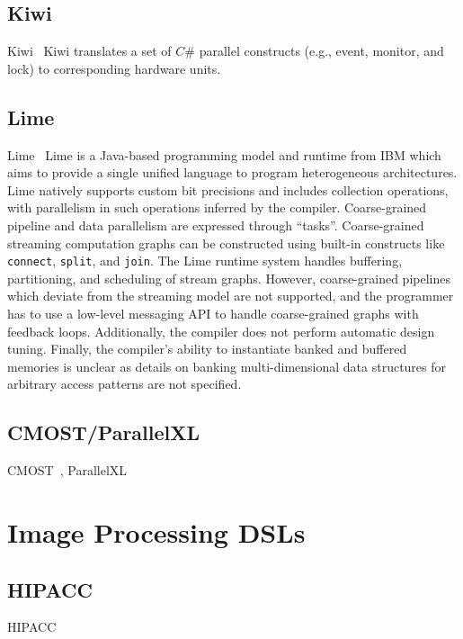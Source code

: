 \subsection{Kiwi}
Kiwi~\cite{kiwi}
Kiwi translates a set of $C\#$ parallel constructs (e.g., event, monitor,
and lock) to corresponding hardware units.

\subsection{Lime}
Lime~\cite{lime}
%
Lime is a Java-based programming model and runtime from IBM which aims to provide a single unified language to program heterogeneous architectures. Lime natively supports custom bit precisions and includes collection operations, with parallelism in such operations inferred by the compiler. Coarse-grained pipeline and data parallelism are expressed through ``tasks''. Coarse-grained streaming computation graphs can be constructed using built-in constructs like \texttt{\small{connect}}, \texttt{\small{split}}, and \texttt{\small{join}}. The Lime runtime system handles buffering, partitioning, and scheduling of stream graphs. However, coarse-grained pipelines which deviate from the streaming model are not supported, and the programmer has to use a low-level messaging API to handle coarse-grained graphs with feedback loops. Additionally, the compiler does not perform automatic design tuning. Finally, the compiler's ability to instantiate banked and buffered memories is unclear as details on banking multi-dimensional data structures for arbitrary access patterns are not specified.

\subsection{CMOST/ParallelXL}
CMOST~\cite{zhang_DAC_2015_cmost}, ParallelXL~\cite{chen_micro_2018_parallelXL}



\section{Image Processing DSLs}

\subsection{HIPACC}
HIPACC~\cite{membarth_2016_hipa}
%

